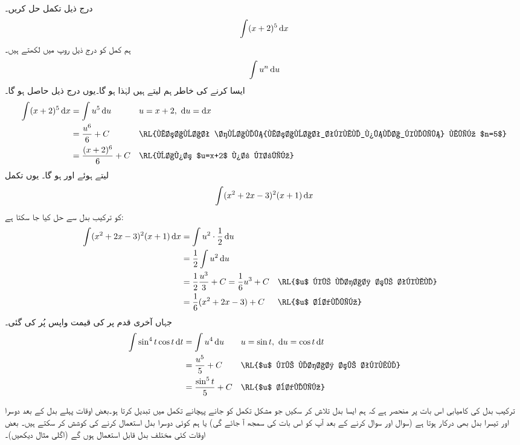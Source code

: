 درج ذیل تکمل حل کریں۔
\begin{align*}
\int(x+2)^5\dif x
\end{align*}
ہم  کمل کو درج ذیل روپ میں لکھتے ہیں۔
\begin{align*}
\int u^n\dif u
\end{align*}
ایسا کرنے کی خاطر ہم  لیتے ہیں لہٰذا  ہو گا۔یوں درج ذیل حاصل ہو گا۔
\begin{align*}
\int (x+2)^5\dif x&=\int u^5\dif u&&u=x+2,\,\,\dif u=\dif x\\
&=\frac{u^6}{6}+C&& \text{\RL{مساوات \حوالہ{مساوات_تکمل_پہلا_کلیہ} میں $n=5$}}\\
&=\frac{(x+2)^6}{6}+C&&\text{\RL{واپس $u=x+2$ پر کریں}}
\end{align*}
 لیتے ہوئے  اور  ہو گا۔ یوں تکمل
\begin{align*}
\int (x^2+2x-3)^2(x+1)\dif x
\end{align*}
کو ترکیب بدل سے  حل کیا جا سکتا ہے:
\begin{align*}
\int (x^2+2x-3)^2(x+1)\dif x&=\int u^2\cdot \frac{1}{2}\dif u\\
&=\frac{1}{2}\int u^2\dif u\\
&=\frac{1}{2}\frac{u^3}{3}+C=\frac{1}{6}u^3+C&&\text{\RL{$u$ کے لحاظ سے تکمل}}\\
&=\frac{1}{6}(x^2+2x-3)+C&&\text{\RL{$u$ بدلیں}}
\end{align*}
جہاں آخری قدم پر  کی قیمت واپس پُر کی گئی۔
\begin{align*}
\int\sin^4t\cos t\dif t&=\int u^4\dif u&&u=\sin t,\,\, \dif u=\cos t\dif t\\
&=\frac{u^5}{5}+C&&\text{\RL{$u$ کے لحاظ سے تکمل}}\\
&=\frac{\sin^5t}{5}+C&&\text{\RL{$u$ بدلیں}}
\end{align*}

ترکیب بدل کی کامیابی اس بات پر منحصر ہے کہ ہم ایسا بدل تلاش کر سکیں جو مشکل تکمل کو جانے پہچانے تکمل میں تبدیل کرتا ہو۔بعض اوقات پہلے بدل کے بعد دوسرا اور تیسرا بدل بھی درکار ہوتا ہے (سوال  اور سوال  کرنے کے بعد آپ کو اس بات کی سمجھ آ جائے گی) یا ہم کوئی دوسرا بدل استعمال کرنے کی کوشش کر سکتے ہیں۔ بعض اوقات کئی مختلف بدل قابل استعمال ہوں گے (اگلی مثال دیکھیں)۔


